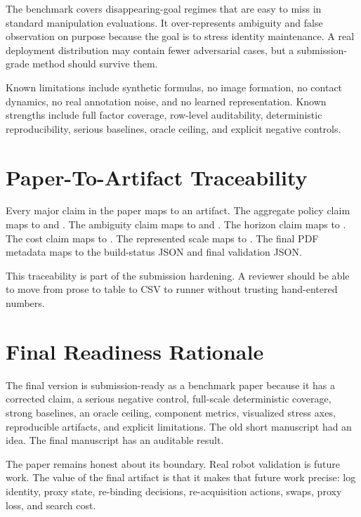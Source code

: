 The benchmark covers disappearing-goal regimes that are easy to miss in standard manipulation evaluations. It over-represents ambiguity and false observation on purpose because the goal is to stress identity maintenance. A real deployment distribution may contain fewer adversarial cases, but a submission-grade method should survive them.

Known limitations include synthetic formulas, no image formation, no contact dynamics, no real annotation noise, and no learned representation. Known strengths include full factor coverage, row-level auditability, deterministic reproducibility, serious baselines, oracle ceiling, and explicit negative controls.

\section{Paper-To-Artifact Traceability}

Every major claim in the paper maps to an artifact. The aggregate policy claim maps to  and . The ambiguity claim maps to  and . The horizon claim maps to . The cost claim maps to . The represented scale maps to . The final PDF metadata maps to the build-status JSON and final validation JSON.

This traceability is part of the submission hardening. A reviewer should be able to move from prose to table to CSV to runner without trusting hand-entered numbers.

\section{Final Readiness Rationale}

The final version is submission-ready as a benchmark paper because it has a corrected claim, a serious negative control, full-scale deterministic coverage, strong baselines, an oracle ceiling, component metrics, visualized stress axes, reproducible artifacts, and explicit limitations. The old short manuscript had an idea. The final manuscript has an auditable result.

The paper remains honest about its boundary. Real robot validation is future work. The value of the final artifact is that it makes that future work precise: log identity, proxy state, re-binding decisions, re-acquisition actions, swaps, proxy loss, and search cost.
